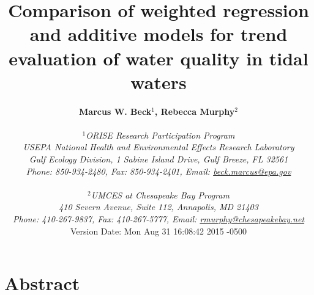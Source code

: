 \documentclass[letterpaper,12pt,oneside]{article}\usepackage[]{graphicx}\usepackage[]{color}
\begin{document}
\raggedbottom
\raggedright
{}
\setlength{\parindent}{0.5in}
\renewcommand\refname{References \vspace{12pt}}

\begin{singlespace}
\title{{\bf {\Large Comparison of weighted regression and additive models for trend evaluation of water quality in tidal waters}}}
\author{
  {\bf {\normalsize Marcus W. Beck$^1$, Rebecca Murphy$^2$}}
  \\\\{\textit {\normalsize $^1$ORISE Research Participation Program}}
  \\{\textit {\normalsize USEPA National Health and Environmental Effects Research Laboratory}}
  \\{\textit {\normalsize Gulf Ecology Division, 1 Sabine Island Drive, Gulf Breeze, FL 32561}}
	\\{\textit {\normalsize Phone: 850-934-2480, Fax: 850-934-2401, Email: \href{mailto:beck.marcus@epa.gov}{beck.marcus@epa.gov}}}
  \\\\{\textit {\normalsize $^2$UMCES at Chesapeake Bay Program}}
	\\{\textit {\normalsize 410 Severn Avenue, Suite 112, Annapolis, MD 21403}}
	\\{\textit {\normalsize Phone: 410-267-9837, Fax: 410-267-5777, Email: \href{mailto:rmurphy@chesapeakbay.net}{rmurphy@chesapeakebay.net}}}
  \vspace{1in} 
  \\ Version Date:   Mon Aug 31 16:08:42 2015 -0500
	}
\date{}
\maketitle
\end{singlespace}
\clearpage

\section*{Abstract}
\end{document}
